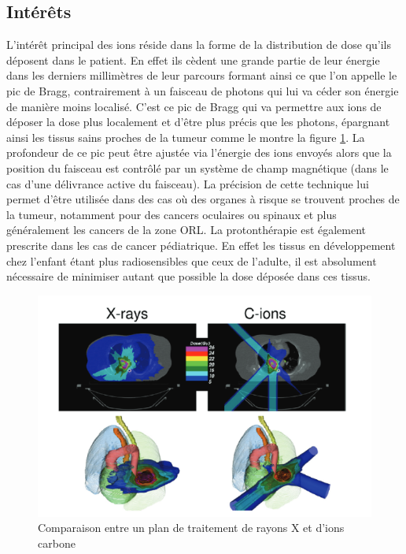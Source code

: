 \documentclass[11pt,a4paper,oldfontcommands]{memoir}
\begin{document}
\subsection{Intérêts}
L'intérêt principal des ions réside dans la forme de la distribution de  dose qu'ils déposent dans le patient. En effet ils cèdent une grande partie de leur énergie dans les derniers millimètres de leur parcours formant ainsi ce que l'on appelle le pic de Bragg, contrairement à un faisceau de photons qui lui va céder son énergie de manière moins localisé. C'est ce pic de Bragg qui va permettre aux ions de déposer la dose plus localement et d'être plus précis que les photons, épargnant ainsi les tissus sains proches de la tumeur comme le montre la figure \ref{CvsG}. La profondeur de ce pic peut être ajustée via l'énergie des ions envoyés alors que la position du faisceau est contrôlé par un système de champ magnétique (dans le cas d'une délivrance active du faisceau). La précision de cette technique lui permet d'être utilisée dans des cas où des organes à risque se trouvent proches de la tumeur, notamment pour des cancers oculaires ou spinaux et plus généralement les cancers de la zone ORL. La protonthérapie est également prescrite dans les cas de cancer pédiatrique. En effet les tissus en développement chez l'enfant étant plus radiosensibles que ceux de l'adulte, il est absolument nécessaire de minimiser autant que possible la dose déposée dans ces tissus. \\
\begin{figure}
    \centering
    \includegraphics[scale = 0.7]{intro/xrvshDuranteetal2016.png}
    \caption{Comparaison entre un plan de traitement de rayons X et d'ions carbone \cite{Durante_2016}}
    \label{CvsG}
\end{figure}
\end{document}
